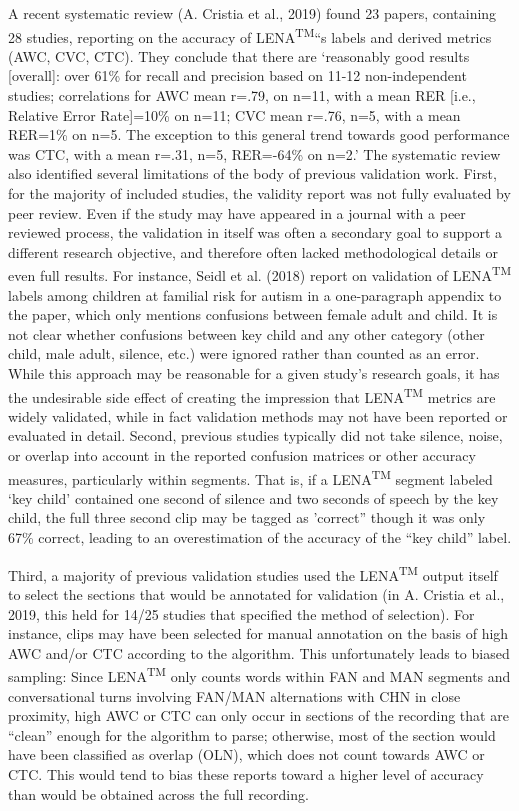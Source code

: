 \documentclass[english,floatsintext,man]{apa6}
\begin{document}
A recent systematic review (A. Cristia et al., 2019) found 23 papers,
containing 28 studies, reporting on the accuracy of
LENA\textsuperscript{TM}\enquote{s labels and derived metrics (AWC, CVC,
CTC). They conclude that there are \enquote{reasonably good results
{[}overall{]}: over 61\% for recall and precision based on 11-12
non-independent studies; correlations for AWC mean r=.79, on n=11, with
a mean RER {[}i.e., Relative Error Rate{]}=10\% on n=11; CVC mean r=.76,
n=5, with a mean RER=1\% on n=5. The exception to this general trend
towards good performance was CTC, with a mean r=.31, n=5, RER=-64\% on
n=2.} The systematic review also identified several limitations of the
body of previous validation work. First, for the majority of included
studies, the validity report was not fully evaluated by peer review.
Even if the study may have appeared in a journal with a peer reviewed
process, the validation in itself was often a secondary goal to support
a different research objective, and therefore often lacked
methodological details or even full results. For instance, Seidl et al.
(2018) report on validation of LENA\textsuperscript{TM} labels among
children at familial risk for autism in a one-paragraph appendix to the
paper, which only mentions confusions between female adult and child. It
is not clear whether confusions between key child and any other category
(other child, male adult, silence, etc.) were ignored rather than
counted as an error. While this approach may be reasonable for a given
study's research goals, it has the undesirable side effect of creating
the impression that LENA\textsuperscript{TM} metrics are widely
validated, while in fact validation methods may not have been reported
or evaluated in detail. Second, previous studies typically did not take
silence, noise, or overlap into account in the reported confusion
matrices or other accuracy measures, particularly within segments. That
is, if a LENA\textsuperscript{TM} segment labeled \enquote{key child}
contained one second of silence and two seconds of speech by the key
child, the full three second clip may be tagged as 'correct} though it
was only 67\% correct, leading to an overestimation of the accuracy of
the \enquote{key child} label.

Third, a majority of previous validation studies used the
LENA\textsuperscript{TM} output itself to select the sections that would
be annotated for validation (in A. Cristia et al., 2019, this held for
14/25 studies that specified the method of selection). For instance,
clips may have been selected for manual annotation on the basis of high
AWC and/or CTC according to the algorithm. This unfortunately leads to
biased sampling: Since LENA\textsuperscript{TM} only counts words within
FAN and MAN segments and conversational turns involving FAN/MAN
alternations with CHN in close proximity, high AWC or CTC can only occur
in sections of the recording that are \enquote{clean} enough for the
algorithm to parse; otherwise, most of the section would have been
classified as overlap (OLN), which does not count towards AWC or CTC.
This would tend to bias these reports toward a higher level of accuracy
than would be obtained across the full recording.
\end{document}
